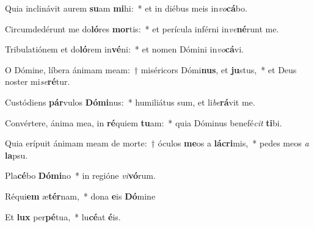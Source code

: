 ﻿\item Quia inclinávit aurem \textbf{su}am \textbf{mi}hi:~* et in diébus meis in\textit{vo}\textbf{cá}bo.

\item Circumdedérunt me do\textbf{ló}res \textbf{mor}tis:~* et perícula inférni in\textit{ve}\textbf{né}runt me.

\item Tribulatiónem et do\textbf{ló}rem in\textbf{vé}ni:~* et nomen Dómini in\textit{vo}\textbf{cá}vi.

\item O Dómine, líbera ánimam meam:~† miséricors Dómi\textbf{nus}, et \textbf{ju}stus,~* et Deus noster mi\textit{se}\textbf{ré}tur.

\item Custódiens \textbf{pár}vulos \textbf{Dó}\textbf{mi}nus:~* humiliátus sum, et li\textit{be}\textbf{rá}vit me.

\item Convértere, ánima mea, in \textbf{ré}quiem \textbf{tu}am:~* quia Dóminus benefé\textit{cit} \textbf{ti}bi.

\item Quia erípuit ánimam meam de morte:~† óculos \textbf{me}os a \textbf{lá}\textbf{cri}mis,~* pedes meos \textit{a} \textbf{la}psu.

\item Pla\textbf{cé}bo \textbf{Dó}\textbf{mi}no~* in regióne \textit{vi}\textbf{vó}rum.

\item Réqui\textbf{em} æ\textbf{tér}nam,~* dona \textbf{e}is \textbf{Dó}mine

\item Et \textbf{lux} per\textbf{pé}tua,~* lu\textbf{cé}at \textbf{é}is.

